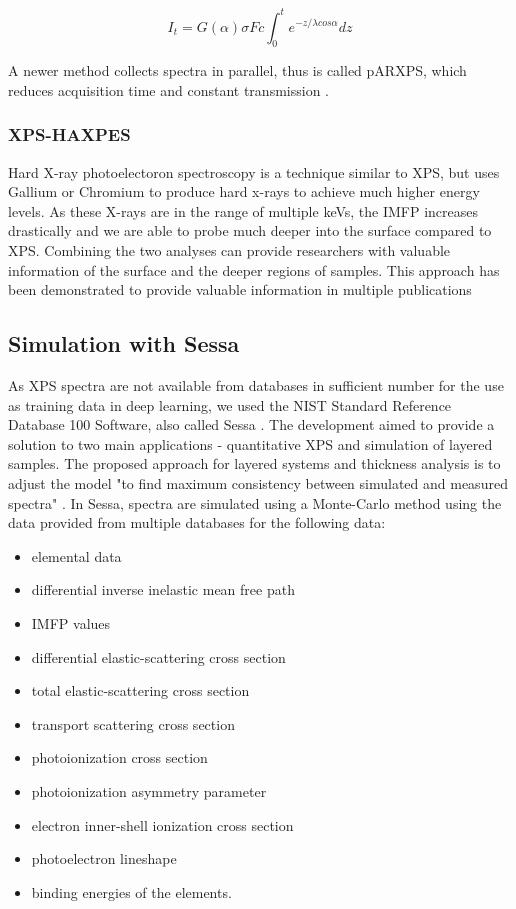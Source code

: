 \begin{equation}
\label{intensity_angle}
    I_{t} = G(\alpha)\sigma F c \int_{0}^{t} e^{-z/ \lambda cos \alpha} dz
\end{equation}

A newer method collects spectra in parallel, thus is called pARXPS, which reduces acquisition time and constant transmission \cite{bure_assessing_2023}.

\subsubsection{XPS-HAXPES}

Hard X-ray photoelectoron spectroscopy is a technique similar to XPS, but uses Gallium or Chromium to produce hard x-rays to achieve much higher energy levels. As these X-rays are in the range of multiple keVs, the IMFP increases drastically and we are able to probe much deeper into the surface compared to XPS. Combining the two analyses can provide researchers with valuable information of the surface and the deeper regions of samples. This approach has been demonstrated to provide valuable information in multiple publications \cite{bure_assessing_2023, siol_concepts_2020} 

\subsection{Simulation with Sessa}
As XPS spectra are not available from databases in sufficient number for the use as training data in deep learning, we used the NIST Standard Reference Database 100 Software, also called Sessa \cite{noauthor_nist_2010, smekal_simulation_2005}. The development aimed to provide a solution to two main applications - quantitative XPS and simulation of layered samples. The proposed approach for layered systems and thickness analysis is to adjust the model "to find maximum consistency between simulated and measured spectra" \cite{smekal_simulation_2005}.
In Sessa, spectra are simulated using a Monte-Carlo method using the data provided from multiple databases for the following data:

\begin{itemize}
    \item elemental data
    \item differential inverse inelastic mean free path
    \item IMFP values
    \item differential elastic-scattering cross section
    \item total elastic-scattering cross section
    \item transport scattering cross section
    \item photoionization cross section
    \item photoionization asymmetry parameter
    \item electron inner-shell ionization cross section
    \item photoelectron lineshape
    \item binding energies of the elements.
\end{itemize}

